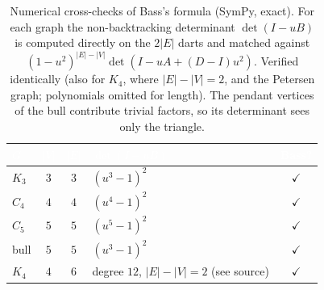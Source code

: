 \begin{table}[t]
  \centering
  \small
  \caption{Numerical cross-checks of Bass's formula (SymPy, exact). For each graph the
  non-backtracking determinant $\det(I-uB)$ is computed directly on the $2|E|$ darts and matched
  against $(1-u^2)^{|E|-|V|}\det(I-uA+(D-I)u^2)$. Verified identically (also for $K_4$, where
  $|E|-|V|=2$, and the Petersen graph; polynomials omitted for length). The pendant vertices of the
  bull contribute trivial factors, so its determinant sees only the triangle.}
  \label{tab:bass_checks}
  \begin{tabular}{@{}lcclc@{}}
    \toprule
    \rowcolor{ggteal}
    \textcolor{white}{\textbf{$G$}} & \textcolor{white}{\textbf{$|V|$}} & \textcolor{white}{\textbf{$|E|$}} & \textcolor{white}{\textbf{$\det(I-uB)$}} & \textcolor{white}{\textbf{Bass?}} \\
    \midrule
    \rowcolor{ggband}
    $K_3$  & $3$ & $3$ & $(u^{3}-1)^{2}$ & $\checkmark$ \\
    $C_4$  & $4$ & $4$ & $(u^{4}-1)^{2}$ & $\checkmark$ \\
    \rowcolor{ggband}
    $C_5$  & $5$ & $5$ & $(u^{5}-1)^{2}$ & $\checkmark$ \\
    bull   & $5$ & $5$ & $(u^{3}-1)^{2}$ & $\checkmark$ \\
    \rowcolor{ggband}
    $K_4$  & $4$ & $6$ & degree $12$, $|E|-|V|=2$ (see source) & $\checkmark$ \\
    \bottomrule
  \end{tabular}
\end{table}
